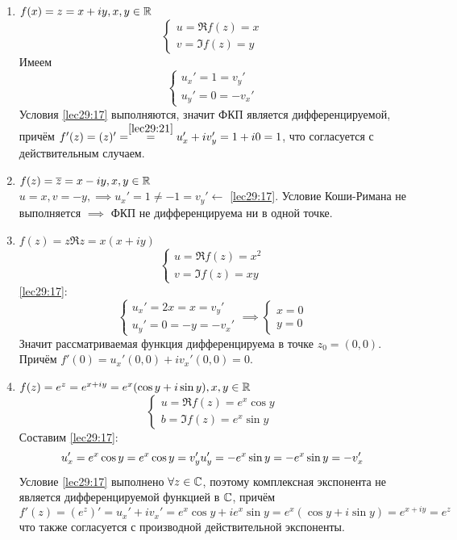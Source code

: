 \documentclass[../../main.tex]{subfiles}
\begin{document}
\begin{exmps}
\begin{enumerate}
	\item $ f(x) = z = x + iy, x, y \in \mathbb{R} $
	\[
	\begin{cases}
		u = \Re f(z) = x\\
		v = \Im f(z) = y
	\end{cases}
	\]
	Имеем 
	\[
	\begin{cases}
		u_x' = 1 = v_y'\\
		u_y' = 0 = -v_x'
	\end{cases}
	\]
	Условия \eqref{lec29:17} выполняются, значит ФКП является дифференцируемой,
	причём $ f'(z) = (z)' = \stackrel{\eqref{lec29:21}}{=} u_x' + iv_y' = 
	1 + i0 = 1 $, что согласуется с действительным случаем.
	\item $ f(z) = \overline{z} = x - iy, x, y \in \mathbb{R} $\\
	$ u = x, v = -y, \implies u_x' = 1 \neq -1 = v_y' \leftarrow $ 
	\eqref{lec29:17}. Условие Коши-Римана не выполняется $ \implies $ ФКП 
	не дифференцируема ни в одной точке.
	\item $ f(z) = z \Re z = x(x + iy) $
	\[
	\begin{cases}
		u = \Re f(z) = x^2\\
		v = \Im f(z) = xy
	\end{cases}
	\]
	\eqref{lec29:17}:
	\[
	\begin{cases}
		u_x' = 2x = x = v_y'\\
		u_y' = 0 = -y = -v_x'
	\end{cases} \implies
	\begin{cases}
		x = 0\\
		y = 0
	\end{cases}
	\]
	Значит рассматриваемая функция дифференцируема в точке $ z_0 = (0, 0) $.
	Причём
	$ f'(0) = u_x'(0, 0) + iv_x'(0, 0) = 0 $.
	\item $ f(z) = e^z = e^{x + iy} = e^x(\cos y + i\sin y), x, y \in \mathbb{R} $\\
	\[
	\begin{cases}
		u = \Re f(z) = e^x \cos y\\
		b = \Im f(z) = e^x \sin y
	\end{cases}
	\]
	Составим \eqref{lec29:17}:
	\[
	u_x' = e^x \cos y = e^x \cos y = v_y'\\
	u_y' = -e^x \sin y = -e^x \sin y = -v_x'
	\]
	Условие \eqref{lec29:17} выполнено $ \forall z \in \mathbb{C} $, 
	поэтому комплексная экспонента не является дифференцируемой функцией в $ \mathbb{C} $, причём
	\[
	f'(z) = (e^z)' = u_x' + iv_x' = e^x \cos y + ie^x \sin y =
	e^x(\cos y + i\sin y) = e^{x + iy} = e^z
	\]
	что также согласуется с производной действительной экспоненты.
\end{enumerate}
\end{exmps}
\end{document}
